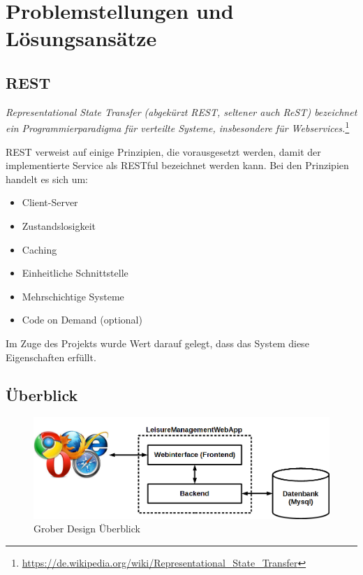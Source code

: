 \section{Problemstellungen und Lösungsansätze}

\subsection{REST}
\textit{Representational State Transfer (abgekürzt REST, seltener auch ReST) bezeichnet ein Programmierparadigma für verteilte Systeme, insbesondere für Webservices.}\vspace{5mm}\footnote{\url{https://de.wikipedia.org/wiki/Representational_State_Transfer}}

REST verweist auf einige Prinzipien, die vorausgesetzt werden, damit der implementierte Service als RESTful bezeichnet werden kann. Bei den Prinzipien handelt es sich um: 
\begin{itemize}
	\item Client-Server
	\item Zustandslosigkeit
	\item Caching
	\item Einheitliche Schnittstelle
	\item Mehrschichtige Systeme
	\item Code on Demand (optional)
\end{itemize}
Im Zuge des Projekts wurde Wert darauf gelegt, dass das System diese Eigenschaften erfüllt.

\subsection{Überblick}

\begin{figure}[h]
	\centering
	\includegraphics[width=0.7\linewidth]{2_solutions/pics/overview}
	\caption{Grober Design Überblick}
	\label{fig:overview}
\end{figure}

